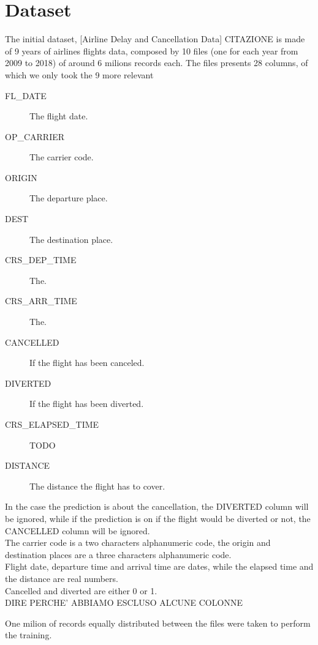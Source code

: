 \documentclass[
	letterpaper, %
	10pt, %
]{class}
\begin{document}

\section{Dataset}

The initial dataset, [Airline Delay and Cancellation Data] CITAZIONE is made of 9 years of airlines flights data, composed by 10 files (one for each year from 2009 to 2018) of around 6 milions records each.
The files presents 28 columns, of which we only took the 9 more relevant\\

\begin{description}
	\item[FL\_DATE] The flight date.
	\item[OP\_CARRIER] The carrier code.
	\item[ORIGIN] The departure place.
	\item[DEST] The destination place.
	\item[CRS\_DEP\_TIME] The.
	\item[CRS\_ARR\_TIME] The.
	\item[CANCELLED] If the flight has been canceled.
	\item[DIVERTED] If the flight has been diverted.
	\item[CRS\_ELAPSED\_TIME] TODO
	\item[DISTANCE] The distance the flight has to cover.\\
\end{description}

In the case the prediction is about the cancellation, the DIVERTED column will be ignored, while if the prediction is on if the flight would be diverted or not, the CANCELLED column will be ignored.\\
The carrier code is a two characters alphanumeric code, the origin and destination places are a three characters alphanumeric code.\\
Flight date, departure time and arrival time are dates, while the elapsed time and the distance are real numbers.\\
Cancelled and diverted are either 0 or 1.\\

DIRE PERCHE' ABBIAMO ESCLUSO ALCUNE COLONNE

One milion of records equally distributed between the files were taken to perform the training.
\end{document}
